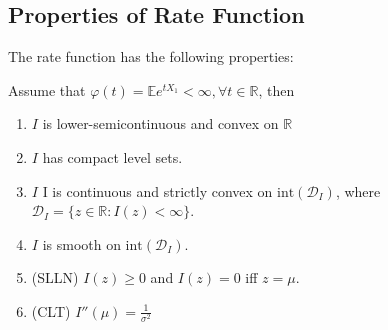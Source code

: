 \subsection{Properties of Rate Function}

The rate function has the following properties:

\begin{lemma}
	\label{lem:HollanderI14}
	Assume that $\varphi(t) = \mathbb{E}e^{t X_1} < \infty , \forall t \in \mathbb{R}$, then 
	\begin{enumerate}
		\item $I$ is lower-semicontinuous and convex on $\mathbb{R}$
		\item $I$ has compact level sets.
		\item $I$ I is continuous and strictly convex on $\text{int}(\mathcal{D}_I)$, where $\mathcal{D}_I = \{z \in \mathbb{R}: I(z) < \infty \} $.
		\item $I$ is smooth on $\text{int}(\mathcal{D}_I)$.
		\item (SLLN) $I(z) \ge 0$ and $ I(z) = 0$ iff $z = \mu$.
		\item  (CLT) $I''(\mu) = \frac{1}{\sigma^2}$
	\end{enumerate}
	
\end{lemma}
